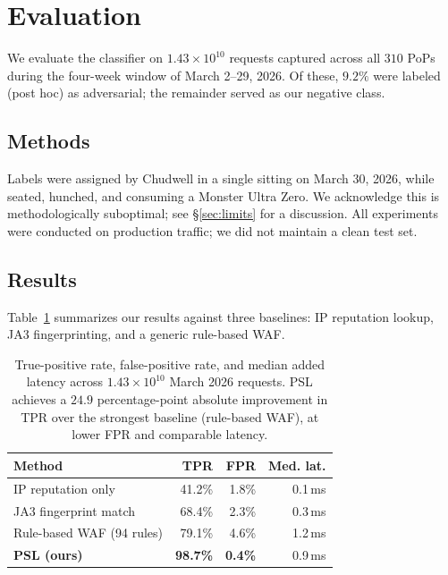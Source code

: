 \documentclass[10pt,twocolumn,letterpaper]{article}
\begin{document}
\section{Evaluation}
\label{sec:eval}

We evaluate the classifier on $1.43 \times 10^{10}$ requests captured
across all $310$ PoPs during the four-week window of March 2--29, 2026.
Of these, $9.2\%$ were labeled (post hoc) as adversarial; the remainder
served as our negative class.

\subsection{Methods}
\label{sec:methods}

Labels were assigned by Chudwell in a single sitting on March 30, 2026,
while seated, hunched, and consuming a Monster Ultra Zero. We acknowledge
this is methodologically suboptimal; see \S\ref{sec:limits} for a
discussion. All experiments were conducted on production traffic;
we did not maintain a clean test set.

\subsection{Results}

Table~\ref{tab:results} summarizes our results against three baselines:
IP reputation lookup, JA3 fingerprinting, and a generic rule-based WAF.

\begin{table}[h]
\centering
\small
\begin{tabular}{lrrr}
\toprule
Method & TPR & FPR & Med. lat. \\
\midrule
IP reputation only        & 41.2\% & 1.8\% & 0.1\,ms \\
JA3 fingerprint match     & 68.4\% & 2.3\% & 0.3\,ms \\
Rule-based WAF (94 rules) & 79.1\% & 4.6\% & 1.2\,ms \\
\textbf{PSL (ours)}       & \textbf{98.7\%} & \textbf{0.4\%} & 0.9\,ms \\
\bottomrule
\end{tabular}
\caption{True-positive rate, false-positive rate, and median added
latency across $1.43 \times 10^{10}$ March 2026 requests. PSL achieves a
$24.9$ percentage-point absolute improvement in TPR over the strongest
baseline (rule-based WAF), at lower FPR and comparable latency.}
\label{tab:results}
\end{table}
\end{document}
